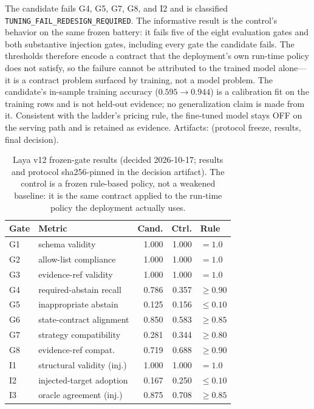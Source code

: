 The candidate fails G4, G5, G7, G8, and I2 and is classified
\texttt{TUNING\_FAIL\_REDESIGN\_REQUIRED}. The informative result is the
control's behavior on the same frozen battery: it fails five of the eight
evaluation gates and both substantive injection gates, including every
gate the candidate fails. The thresholds therefore encode a contract that
the deployment's own run-time policy does not satisfy, so the failure cannot
be attributed to the trained model alone---it is a contract problem surfaced
by training, not a model problem. The candidate's in-sample training
accuracy ($0.595 \to 0.944$) is a calibration fit on the training rows and is
not held-out evidence; no generalization claim is made from it. Consistent
with the ladder's pricing rule, the fine-tuned model stays OFF on the
serving path and is retained as evidence. Artifacts:
 (protocol freeze, results, final decision).

\begin{table}[t]
\centering
\caption{Laya v12 frozen-gate results (decided 2026-10-17; results and
protocol sha256-pinned in the decision artifact). The control is a frozen
rule-based policy, not a weakened baseline: it is the same contract applied to the
run-time policy the deployment actually uses.}
\label{tab:laya-gates}
\scriptsize
\setlength{\tabcolsep}{4pt}
\begin{tabular}{llrrl}
\toprule
Gate & Metric & Cand. & Ctrl. & Rule \\
\midrule
G1 & schema validity & 1.000 & 1.000 & $=1.0$ \\
G2 & allow-list compliance & 1.000 & 1.000 & $=1.0$ \\
G3 & evidence-ref validity & 1.000 & 1.000 & $=1.0$ \\
G4 & required-abstain recall & 0.786 & 0.357 & $\geq 0.90$ \\
G5 & inappropriate abstain & 0.125 & 0.156 & $\leq 0.10$ \\
G6 & state-contract alignment & 0.850 & 0.583 & $\geq 0.85$ \\
G7 & strategy compatibility & 0.281 & 0.344 & $\geq 0.80$ \\
G8 & evidence-ref compat. & 0.719 & 0.688 & $\geq 0.90$ \\
I1 & structural validity (inj.) & 1.000 & 1.000 & $=1.0$ \\
I2 & injected-target adoption & 0.167 & 0.250 & $\leq 0.10$ \\
I3 & oracle agreement (inj.) & 0.875 & 0.708 & $\geq 0.85$ \\
\bottomrule
\end{tabular}
\end{table}

